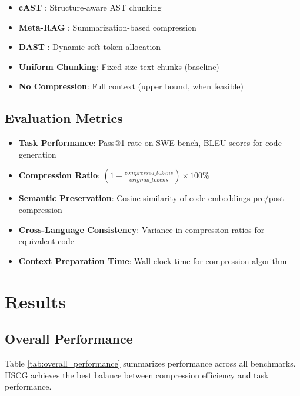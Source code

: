 \documentclass[conference]{IEEEtran}
\begin{document}
\begin{itemize}
    \item \textbf{cAST} \cite{zhang2024cast}: Structure-aware AST chunking
    \item \textbf{Meta-RAG} \cite{tawosi2024metarag}: Summarization-based compression
    \item \textbf{DAST} \cite{liu2025dast}: Dynamic soft token allocation
    \item \textbf{Uniform Chunking}: Fixed-size text chunks (baseline)
    \item \textbf{No Compression}: Full context (upper bound, when feasible)
\end{itemize}

\subsection{Evaluation Metrics}

\begin{itemize}
    \item \textbf{Task Performance}: Pass@1 rate on SWE-bench, BLEU scores for code generation
    \item \textbf{Compression Ratio}: $(1 - \frac{compressed\_tokens}{original\_tokens}) \times 100\%$
    \item \textbf{Semantic Preservation}: Cosine similarity of code embeddings pre/post compression
    \item \textbf{Cross-Language Consistency}: Variance in compression ratios for equivalent code
    \item \textbf{Context Preparation Time}: Wall-clock time for compression algorithm
\end{itemize}

\section{Results}

\subsection{Overall Performance}

Table \ref{tab:overall_performance} summarizes performance across all benchmarks. HSCG achieves the best balance between compression efficiency and task performance.
\end{document}
